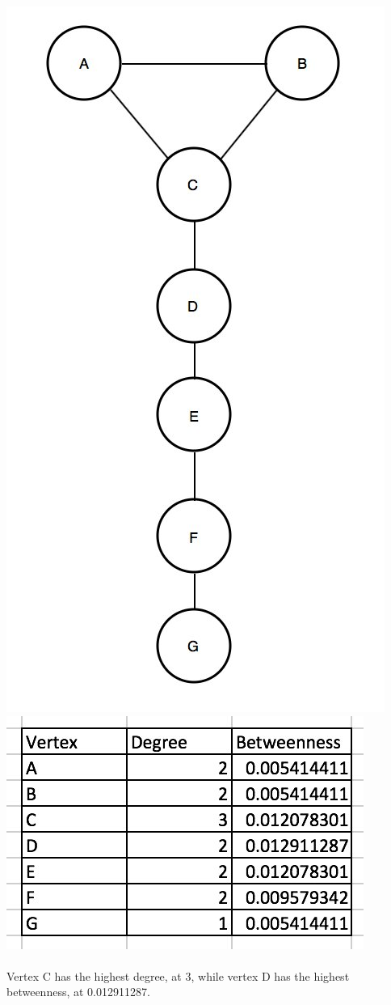 \documentclass[11pt, oneside]{article}   	%
\begin{document}
\includegraphics[scale=.5]{smallNetwork}
\includegraphics{smallTable}
\\\\
Vertex C has the highest degree, at 3, while vertex D has the highest betweenness, at 0.012911287.\\\\\\\\

\inputminted[linenos,fontsize=\scriptsize]{python}{medici.py}

\inputminted[linenos,fontsize=\scriptsize]{python}{smallGraph.py}
\end{document}
